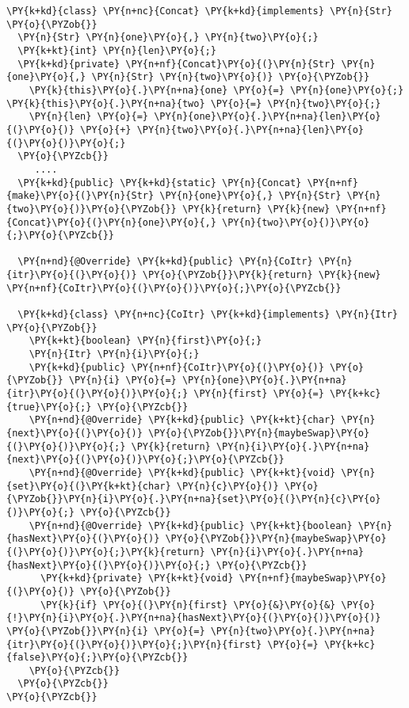 \begin{Verbatim}[commandchars=\\\{\}]
\PY{k+kd}{class} \PY{n+nc}{Concat} \PY{k+kd}{implements} \PY{n}{Str} \PY{o}{\PYZob{}}
  \PY{n}{Str} \PY{n}{one}\PY{o}{,} \PY{n}{two}\PY{o}{;}
  \PY{k+kt}{int} \PY{n}{len}\PY{o}{;}
  \PY{k+kd}{private} \PY{n+nf}{Concat}\PY{o}{(}\PY{n}{Str} \PY{n}{one}\PY{o}{,} \PY{n}{Str} \PY{n}{two}\PY{o}{)} \PY{o}{\PYZob{}}
    \PY{k}{this}\PY{o}{.}\PY{n+na}{one} \PY{o}{=} \PY{n}{one}\PY{o}{;} \PY{k}{this}\PY{o}{.}\PY{n+na}{two} \PY{o}{=} \PY{n}{two}\PY{o}{;}
    \PY{n}{len} \PY{o}{=} \PY{n}{one}\PY{o}{.}\PY{n+na}{len}\PY{o}{(}\PY{o}{)} \PY{o}{+} \PY{n}{two}\PY{o}{.}\PY{n+na}{len}\PY{o}{(}\PY{o}{)}\PY{o}{;}
  \PY{o}{\PYZcb{}}
     ....
  \PY{k+kd}{public} \PY{k+kd}{static} \PY{n}{Concat} \PY{n+nf}{make}\PY{o}{(}\PY{n}{Str} \PY{n}{one}\PY{o}{,} \PY{n}{Str} \PY{n}{two}\PY{o}{)}\PY{o}{\PYZob{}} \PY{k}{return} \PY{k}{new} \PY{n+nf}{Concat}\PY{o}{(}\PY{n}{one}\PY{o}{,} \PY{n}{two}\PY{o}{)}\PY{o}{;}\PY{o}{\PYZcb{}}

  \PY{n+nd}{@Override} \PY{k+kd}{public} \PY{n}{CoItr} \PY{n}{itr}\PY{o}{(}\PY{o}{)} \PY{o}{\PYZob{}}\PY{k}{return} \PY{k}{new} \PY{n+nf}{CoItr}\PY{o}{(}\PY{o}{)}\PY{o}{;}\PY{o}{\PYZcb{}}

  \PY{k+kd}{class} \PY{n+nc}{CoItr} \PY{k+kd}{implements} \PY{n}{Itr} \PY{o}{\PYZob{}}
    \PY{k+kt}{boolean} \PY{n}{first}\PY{o}{;}
    \PY{n}{Itr} \PY{n}{i}\PY{o}{;}
    \PY{k+kd}{public} \PY{n+nf}{CoItr}\PY{o}{(}\PY{o}{)} \PY{o}{\PYZob{}} \PY{n}{i} \PY{o}{=} \PY{n}{one}\PY{o}{.}\PY{n+na}{itr}\PY{o}{(}\PY{o}{)}\PY{o}{;} \PY{n}{first} \PY{o}{=} \PY{k+kc}{true}\PY{o}{;} \PY{o}{\PYZcb{}}
    \PY{n+nd}{@Override} \PY{k+kd}{public} \PY{k+kt}{char} \PY{n}{next}\PY{o}{(}\PY{o}{)} \PY{o}{\PYZob{}}\PY{n}{maybeSwap}\PY{o}{(}\PY{o}{)}\PY{o}{;} \PY{k}{return} \PY{n}{i}\PY{o}{.}\PY{n+na}{next}\PY{o}{(}\PY{o}{)}\PY{o}{;}\PY{o}{\PYZcb{}}
    \PY{n+nd}{@Override} \PY{k+kd}{public} \PY{k+kt}{void} \PY{n}{set}\PY{o}{(}\PY{k+kt}{char} \PY{n}{c}\PY{o}{)} \PY{o}{\PYZob{}}\PY{n}{i}\PY{o}{.}\PY{n+na}{set}\PY{o}{(}\PY{n}{c}\PY{o}{)}\PY{o}{;} \PY{o}{\PYZcb{}}
    \PY{n+nd}{@Override} \PY{k+kd}{public} \PY{k+kt}{boolean} \PY{n}{hasNext}\PY{o}{(}\PY{o}{)} \PY{o}{\PYZob{}}\PY{n}{maybeSwap}\PY{o}{(}\PY{o}{)}\PY{o}{;}\PY{k}{return} \PY{n}{i}\PY{o}{.}\PY{n+na}{hasNext}\PY{o}{(}\PY{o}{)}\PY{o}{;} \PY{o}{\PYZcb{}} 
      \PY{k+kd}{private} \PY{k+kt}{void} \PY{n+nf}{maybeSwap}\PY{o}{(}\PY{o}{)} \PY{o}{\PYZob{}} 
      \PY{k}{if} \PY{o}{(}\PY{n}{first} \PY{o}{&}\PY{o}{&} \PY{o}{!}\PY{n}{i}\PY{o}{.}\PY{n+na}{hasNext}\PY{o}{(}\PY{o}{)}\PY{o}{)} \PY{o}{\PYZob{}}\PY{n}{i} \PY{o}{=} \PY{n}{two}\PY{o}{.}\PY{n+na}{itr}\PY{o}{(}\PY{o}{)}\PY{o}{;}\PY{n}{first} \PY{o}{=} \PY{k+kc}{false}\PY{o}{;}\PY{o}{\PYZcb{}}
    \PY{o}{\PYZcb{}}
  \PY{o}{\PYZcb{}}
\PY{o}{\PYZcb{}}
\end{Verbatim}

